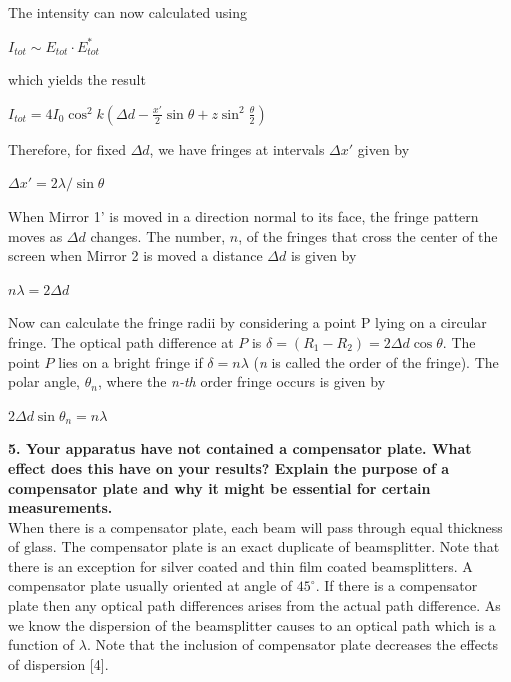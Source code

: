 \documentclass[a4paper,12pt]{report}
\begin{document}
The intensity can now calculated using
\begin{center}
	$I_{tot} \sim E_{tot}\cdot E_{tot}^{*}$
\end{center}
which yields the result
\begin{center}
	$I_{tot}=4 I_{0}\cos^{2}k(\Delta d-\frac{x'}{2}\sin\theta+z\sin^{2}\frac{\theta}{2})$
\end{center}
Therefore, for fixed $\Delta d $, we have fringes at intervals $\Delta x'$ given by
\begin{center}
	$\Delta x'=2 \lambda/\sin\theta$
\end{center}
When Mirror 1' is moved in a direction normal to its face, the fringe pattern moves as $\Delta d$
changes. The number, $n$, of the fringes that cross the center of the screen when Mirror 2 is moved a
distance  $\Delta d$ is given by
\begin{center}
	$n\lambda=2\Delta d$ 
\end{center} 
Now can calculate the fringe radii by considering a point P lying on a circular fringe. The
optical path difference at $P$ is $\delta=(R_{1}-R_{2})=2\Delta d\cos\theta$. The point $P$ lies on a bright fringe if
$\delta=n\lambda$ (\textit{n} is called the order of the fringe). The polar angle, $\theta_{n}$, where the \textit{n-th} order fringe occurs
is given by
\begin{center}
	$2\Delta d\sin\theta_{n}=n\lambda$
\end{center}
\textbf{5. Your apparatus have not contained a compensator plate. What effect does this have on your results? Explain the purpose of a compensator plate and why it might be essential for certain measurements.}\\
When there is a compensator plate, each beam will pass through equal thickness of glass. The compensator plate is an exact duplicate of beamsplitter. Note that there is an exception for silver coated and thin film coated beamsplitters. A compensator plate usually oriented at angle of $45^{\circ}$. If there is a compensator plate then any optical path differences arises from the actual path difference. As we know the dispersion of the beamsplitter causes to an optical path which is a function of $\lambda$. Note that the inclusion of compensator plate decreases the effects of dispersion [4]. 
\newpage 
\end{document}

